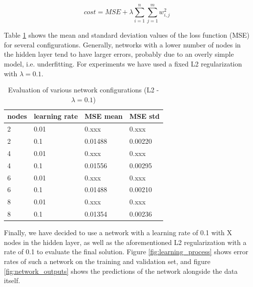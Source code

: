 \documentclass[a4paper]{article}
\begin{document}
\begin{equation}
\label{eqn:l2_regularization}
		cost = MSE + \lambda \sum_{i=1}^{n} \sum_{j=1}^{m} w_{i,j}^2
\end{equation}

Table \ref{table:learning_outcomes} shows the mean and standard deviation values of the loss function (MSE) for several configurations. Generally, networks with a lower number of nodes in the hidden layer tend to have larger errors, probably due to an overly simple model, i.e. underfitting. For experiments we have used a fixed L2 regularization with $\lambda = 0.1$.

\begin{table}
	\centering
	\begin{tabular}{|p{1.5cm}|p{2cm}||p{2cm}|p{1.5cm}|}
		\hline
		nodes&learning rate&MSE mean&MSE std\\
		\hline
		2 & 0.01 & 0.xxx & 0.xxx \\ \hline
		2 & 0.1 & 0.01488 & 0.00220 \\ \hline
		4 & 0.01 & 0.xxx & 0.xxx \\ \hline
		4 & 0.1 & 0.01556 & 0.00295 \\ \hline
		6 & 0.01 & 0.xxx & 0.xxx \\ \hline
		6 & 0.1 & 0.01488 & 0.00210 \\ \hline
		8 & 0.01 & 0.xxx & 0.xxx \\ \hline
		8 & 0.1 & 0.01354 & 0.00236 \\ \hline
	\end{tabular}
	\label{table:learning_outcomes}
	\caption{Evaluation of various network configurations (L2 - $\lambda = 0.1$)}	
\end{table}


Finally, we have decided to use a network with a learning rate of 0.1 with X nodes in the hidden layer, as well as the aforementioned L2 regularization with a rate of 0.1 to evaluate the final solution. Figure \ref{fig:learning_process} shows error rates of such a network on the training and validation set, and figure \ref{fig:network_outputs} shows the predictions of the network alongside the data itself.

\end{document}
